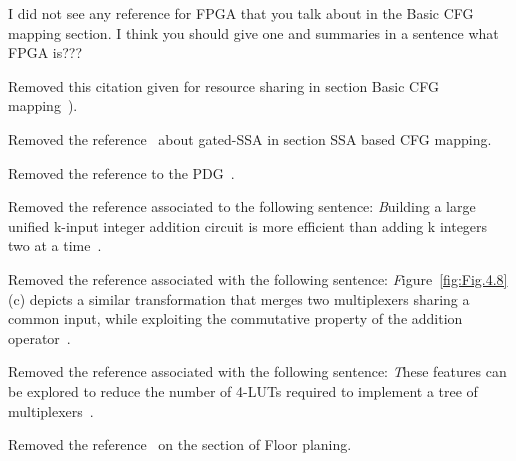 I did not see any reference for FPGA that you talk about in the Basic CFG mapping section. I think you should give one and summaries in a sentence what FPGA is???

Removed this citation given for resource sharing in section Basic CFG mapping~\cite{Memik:DAC03}).

Removed the reference~\cite{Tu-SC95} about gated-SSA in section SSA based CFG mapping.

Removed the reference to the PDG~\cite{Ferrante-TOPLAS87}. 

Removed the reference associated to the following sentence: {\emph Building a large unified k-input integer addition circuit is more
efficient than adding k integers two at a time~\cite{Stelling98,Wallace64}. }

Removed the reference associated with the following sentence: {\emph Figure~\ref{fig:Fig.4.8}(c) depicts a similar transformation that 
merges two multiplexers sharing a common input, while exploiting
the commutative property of the addition operator~\cite{Verma08}.}

Removed the reference associated with the following sentence: {\emph These features can be explored to reduce the number 
of 4-LUTs required to implement a tree of multiplexers~\cite{Nancekievill05}.}

Removed the reference~\cite{Kaplan:DAC03} on the section of Floor planing.
